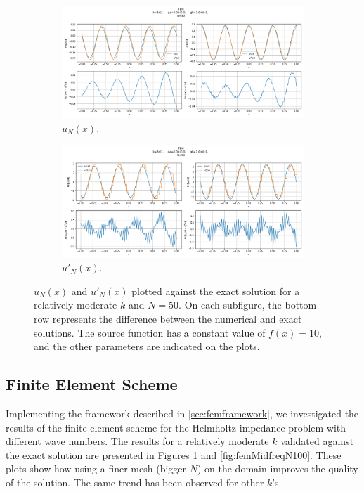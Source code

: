 \begin{figure}[h!]
    \centering
    \begin{subfigure}[b]{0.7\textwidth}
        \includegraphics[width=\textwidth]{img/FEM-Const-MidFreq-N0050-sol.png}
        \caption{$u_N(x)$.}
    \end{subfigure}
    \vfill
    \begin{subfigure}[b]{0.7\textwidth}
        \includegraphics[width=\textwidth]{img/FEM-Const-MidFreq-N0050-der.png}
        \caption{$u'_N(x)$.}
    \end{subfigure}
    \caption{$u_N(x)$ and $u'_N(x)$ plotted against the exact solution for a relatively moderate $k$ and $N=50$. On each subfigure, the bottom row represents the difference between the numerical and exact solutions. The source function has a constant value of $f(x)=10$, and the other parameters are indicated on the plots.}
    \label{fig:femMidfreqN050}
\end{figure}

\subsection{Finite Element Scheme}\label{sec:femresults}
Implementing the framework described in \autoref{sec:femframework}, we investigated the results of the finite element scheme for the Helmholtz impedance problem with different wave numbers. The results for a relatively moderate $k$ validated against the exact solution are presented in Figures \ref{fig:femMidfreqN050} and \ref{fig:femMidfreqN100}. These plots show how using a finer mesh (bigger $N$) on the domain improves the quality of the solution. The same trend has been observed for other $k$'s.

